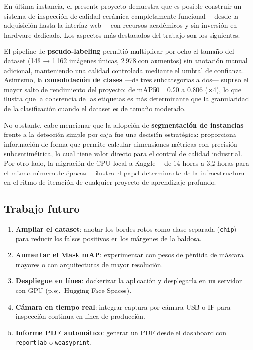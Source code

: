 \documentclass[12pt,a4paper]{article}
\begin{document}
En última instancia, el presente proyecto demuestra que es posible construir un sistema
de inspección de calidad cerámica completamente funcional —desde la adquisición hasta
la interfaz web— con recursos académicos y sin inversión en hardware dedicado. Los
aspectos más destacados del trabajo son los siguientes.

El pipeline de \textbf{pseudo-labeling} permitió multiplicar por ocho el tamaño del
dataset (148 → 1\,162 imágenes únicas, 2\,978 con aumentos) sin anotación manual
adicional, manteniendo una calidad controlada mediante el umbral de confianza.
Asimismo, la \textbf{consolidación de clases} —de tres subcategorías a dos— supuso
el mayor salto de rendimiento del proyecto: de mAP50\,=\,0.20 a 0.806 (×4), lo que
ilustra que la coherencia de las etiquetas es más determinante que la granularidad de
la clasificación cuando el dataset es de tamaño moderado.

No obstante, cabe mencionar que la adopción de \textbf{segmentación de instancias}
frente a la detección simple por caja fue una decisión estratégica: proporciona
información de forma que permite calcular dimensiones métricas con precisión subcentimétrica,
lo cual tiene valor directo para el control de calidad industrial. Por otro lado, la
migración de CPU local a Kaggle —de 14 horas a 3,2 horas para el mismo número de
épocas— ilustra el papel determinante de la infraestructura en el ritmo de iteración
de cualquier proyecto de aprendizaje profundo.

\subsection{Trabajo futuro}

\begin{enumerate}
  \item \textbf{Ampliar el dataset}: anotar los bordes rotos como clase separada
        (\texttt{chip}) para reducir los falsos positivos en los márgenes de la baldosa.
  \item \textbf{Aumentar el Mask mAP}: experimentar con pesos de pérdida de máscara
        mayores o con arquitecturas de mayor resolución.
  \item \textbf{Despliegue en línea}: dockerizar la aplicación y desplegarla en un
        servidor con GPU (p.ej.\ Hugging Face Spaces).
  \item \textbf{Cámara en tiempo real}: integrar captura por cámara USB o IP para
        inspección continua en línea de producción.
  \item \textbf{Informe PDF automático}: generar un PDF desde el dashboard con
        \texttt{reportlab} o \texttt{weasyprint}.
\end{enumerate}
\end{document}
